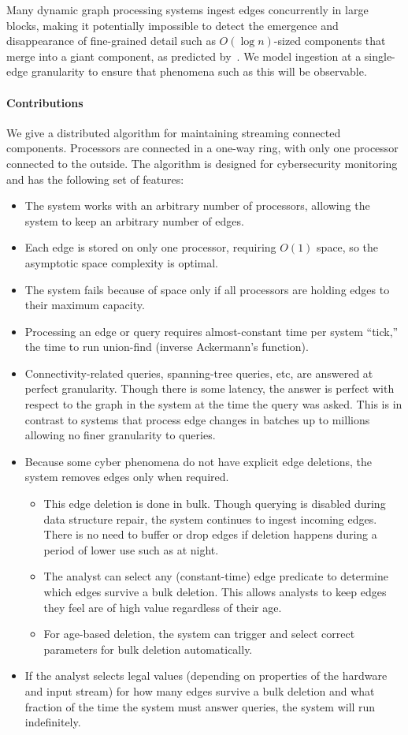  Many dynamic graph processing systems ingest edges concurrently
 in large blocks, making it potentially impossible to detect the emergence and
 disappearance of fine-grained detail such as
 $O(\log n)$-sized components that merge into a giant component,
 as predicted by~\cite{chung}.  We model ingestion at a single-edge
 granularity to ensure that phenomena such as this will be observable.

\paragraph{Contributions} We give a distributed algorithm for maintaining streaming connected components. Processors are connected in a
one-way ring, with only one processor connected to the outside. The algorithm is designed for cybersecurity monitoring and has the following set of features:
\begin{itemize}
\item The system works with an arbitrary number of processors, allowing the system to keep an arbitrary number of edges.
\item Each edge is stored on only one processor, requiring $O(1)$ space, so the asymptotic space complexity is optimal.
\item The system fails because of space only if all processors are holding edges to their maximum capacity.
\item Processing an edge or query requires almost-constant time per system ``tick,'' the time to run union-find (inverse Ackermann's function).
\item Connectivity-related queries, spanning-tree queries, etc, are answered at perfect granularity. Though there is some latency, the answer is perfect with respect to the graph in the system at the time the query was asked.  This is in contrast to systems that process edge changes in batches up to millions allowing no finer granularity to queries.
\item Because some cyber phenomena do not have explicit edge deletions, the system removes edges only when required.
\begin{itemize}
\item This edge deletion is done in bulk.  Though querying is disabled during data structure repair, the system continues to ingest incoming edges. There is no need to buffer or drop edges if deletion happens during a period of lower use such as at night.
\item The analyst can select any (constant-time) edge predicate to determine which edges survive a bulk deletion.  This allows analysts to keep edges they feel are of high value regardless of their age.
\item For age-based deletion, the system can trigger and select correct parameters for bulk deletion automatically.
\end{itemize}
\item If the analyst selects legal values (depending on properties of the hardware and input stream) for how many edges survive a bulk deletion and what fraction of the time the system must answer queries, the system will run indefinitely.
\end{itemize}

